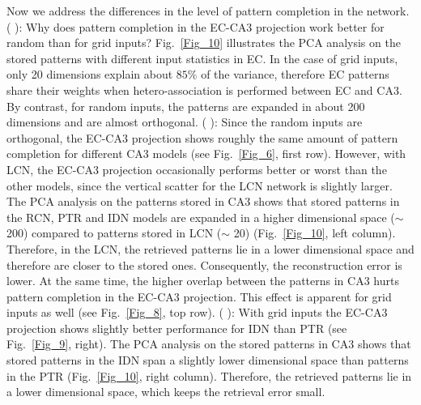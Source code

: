 \documentclass[utf8]{frontiersSCNS} %
\newcommand{\RN}[1]{%
  \textup{\uppercase\expandafter{\romannumeral#1}}%
}
\begin{document}
Now we address the differences in the level of pattern completion in the network. (\RN{1}): Why does pattern completion in the EC-CA3 projection work better for random than for grid inputs? Fig.~\ref{Fig_10} illustrates the PCA analysis on the stored patterns with different input statistics in EC. In the case of grid inputs, only 20 dimensions explain about $85 \%$ of the variance, therefore EC patterns share their weights when hetero-association is performed between EC and CA3. By contrast, for random inputs, the patterns are expanded in about 200 dimensions and are almost orthogonal. (\RN{2}): Since the random inputs are orthogonal, the EC-CA3 projection shows roughly the same amount of pattern completion for different CA3 models (see Fig.~\ref{Fig_6}, first row). However, with LCN, the EC-CA3 projection occasionally performs better or worst than the other models, since the vertical scatter for the LCN network is slightly larger. The PCA analysis on the patterns stored in CA3 shows that stored patterns in the RCN, PTR and IDN models are expanded in a higher dimensional space ($\sim$ 200) compared to patterns stored in LCN ($\sim$ 20) (Fig.~\ref{Fig_10}, left column). Therefore, in the LCN, the retrieved patterns lie in a lower dimensional space and therefore are closer to the stored ones. Consequently, the reconstruction error is lower. At the same time, the higher overlap between the patterns in CA3 hurts pattern completion in the EC-CA3 projection. This effect is apparent for grid inputs as well (see Fig.~\ref{Fig_8}, top row). (\RN{3}): With grid inputs the EC-CA3 projection shows slightly better performance for IDN than PTR (see Fig.~\ref{Fig_9}, right). The PCA analysis on the stored patterns in CA3 shows that stored patterns in the IDN span a slightly lower dimensional space than patterns in the PTR (Fig.~\ref{Fig_10}, right column). Therefore, the retrieved patterns lie in a lower dimensional space, which keeps the retrieval error small.
\end{document}
